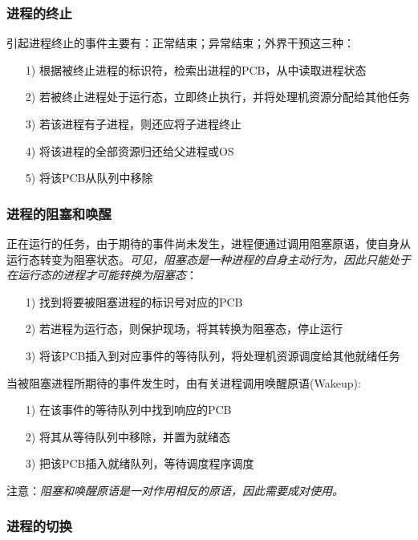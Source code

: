 \subsubsection{进程的终止}

    引起进程终止的事件主要有：正常结束；异常结束；外界干预这三种：

\begin{itemize}
    \item [1)] 根据被终止进程的标识符，检索出进程的PCB，从中读取进程状态
    \item [2)] 若被终止进程处于运行态，立即终止执行，并将处理机资源分配给其他任务
    \item [3)] 若该进程有子进程，则还应将子进程终止
    \item [4)] 将该进程的全部资源归还给父进程或OS
    \item [5)] 将该PCB从队列中移除
\end{itemize}

\subsubsection{进程的阻塞和唤醒}

    正在运行的任务，由于期待的事件尚未发生，进程便通过调用阻塞原语，使自身从运行态转变为阻塞状态。\emph{可见，阻塞态是一种进程的自身主动行为，因此只能处于在运行态的进程才可能转换为阻塞态}：

\begin{itemize}
    \item [1)] 找到将要被阻塞进程的标识号对应的PCB
    \item [2)] 若进程为运行态，则{\color{red}保护现场}，将其转换为阻塞态，停止运行
    \item [3)] 将该PCB插入到对应事件的等待队列，将处理机资源调度给其他就绪任务
\end{itemize}

    当被阻塞进程所期待的事件发生时，由有关进程调用唤醒原语(Wakeup):

\begin{itemize}
    \item [1)] 在该事件的等待队列中找到响应的PCB
    \item [2)] 将其从等待队列中移除，并置为就绪态
    \item [3)] 把该PCB插入就绪队列，等待调度程序调度
\end{itemize}

    注意：\emph{阻塞和唤醒原语是一对作用相反的原语，因此需要成对使用。}

\subsubsection{进程的切换}

